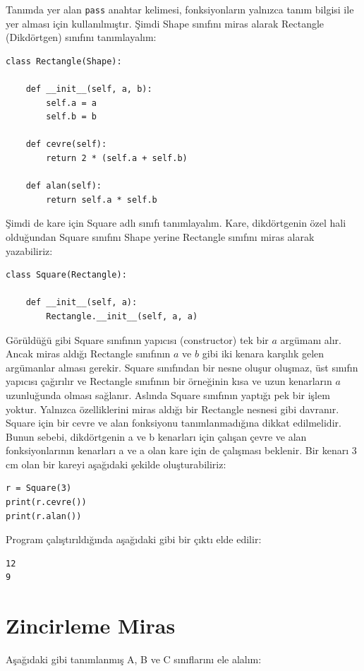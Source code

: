 \documentclass[12pt]{report}
\begin{document}
Tanımda yer alan \texttt{pass} anahtar kelimesi, fonksiyonların yalnızca tanım bilgisi ile yer alması için kullanılmıştır. Şimdi Shape sınıfını miras alarak Rectangle (Dikdörtgen) sınıfını tanımlayalım:

\begin{Verbatim}[frame = single]
class Rectangle(Shape):

	def __init__(self, a, b):
		self.a = a
		self.b = b
	
	def cevre(self):
		return 2 * (self.a + self.b)
	
	def alan(self):
		return self.a * self.b
\end{Verbatim}

Şimdi de kare için Square adlı sınıfı tanımlayalım. Kare, dikdörtgenin özel hali olduğundan Square sınıfını Shape yerine Rectangle sınıfını miras alarak yazabiliriz:


\begin{Verbatim}[frame = single]
class Square(Rectangle):
	
	def __init__(self, a):
		Rectangle.__init__(self, a, a)
\end{Verbatim}

Görüldüğü gibi Square sınıfının yapıcısı (constructor) tek bir $a$ argümanı alır. Ancak miras aldığı Rectangle sınıfının $a$ ve $b$ gibi iki kenara karşılık gelen argümanlar alması gerekir. Square sınıfından bir nesne oluşur oluşmaz, üst sınıfın yapıcısı çağırılır ve Rectangle sınıfının bir örneğinin kısa ve uzun kenarların $a$ uzunluğunda olması sağlanır. Aslında Square sınıfının yaptığı pek bir işlem yoktur. Yalnızca özelliklerini miras aldığı bir Rectangle nesnesi gibi davranır. Square için bir cevre ve alan fonksiyonu tanımlanmadığına dikkat edilmelidir. Bunun sebebi, dikdörtgenin a ve b kenarları için çalışan çevre ve alan fonksiyonlarının kenarları a ve a olan kare için de çalışması beklenir. Bir kenarı 3 cm olan bir kareyi aşağıdaki şekilde oluşturabiliriz:


\begin{Verbatim}[frame = single]
r = Square(3)
print(r.cevre())
print(r.alan())
\end{Verbatim}

Program çalıştırıldığında aşağıdaki gibi bir çıktı elde edilir:

\begin{Verbatim}[frame = single]
12
9
\end{Verbatim}


\pagebreak
\section{Zincirleme Miras}
Aşağıdaki gibi tanımlanmış A, B ve C sınıflarını ele alalım:
\end{document}
